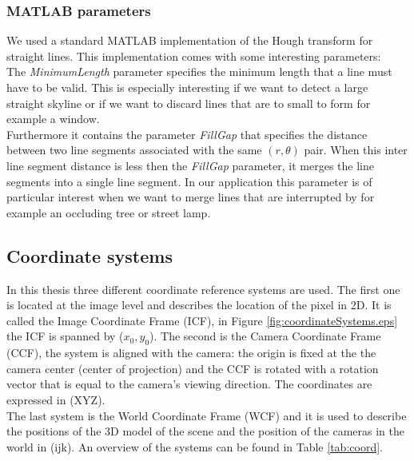 \subsubsection{MATLAB\cite{matlab} parameters}
We used a standard MATLAB\cite{matlab} implementation of the Hough transform for straight lines.  This implementation comes with some interesting parameters:\\

	The \emph{MinimumLength} parameter specifies the minimum length that a line must have to be valid. This is especially interesting if we want to detect a large straight skyline or if we want to discard lines that are to small to form for example a window.\\

	Furthermore it contains the parameter \emph{FillGap} that specifies the distance
	between two line segments associated with the same $(r, \theta)$ pair.
	When this inter line segment distance is less then the \emph{FillGap} parameter, it merges the line segments into a single line segment. In our application this parameter is of particular interest when we want to merge lines that are interrupted by for example an occluding tree or street lamp.\\



\subsection{Coordinate systems}
In this thesis three different coordinate reference systems are used. 
The first one is located at the image level and describes the
location of the pixel in 2D. It is called the Image Coordinate Frame (ICF), in
Figure \ref{fig:coordinateSystems.eps} the ICF is spanned by ($x_0,y_0$).
The second is the Camera Coordinate Frame (CCF), the system is aligned with the
camera: the origin is fixed at the the camera center (center of projection) and the CCF is rotated with
a rotation vector that is equal to the camera's viewing direction.  The coordinates are
expressed in (XYZ). \\
The last system is the World Coordinate Frame (WCF) and it is used to describe the positions of the 3D model of the
scene and the position of the cameras in the world in (ijk). An overview of the
systems can be found in Table \ref{tab:coord}.

